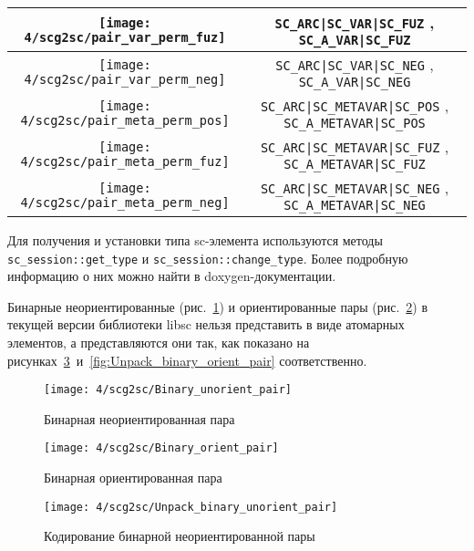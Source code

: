 \begin{table}[ht]
\begin{tabular}{|c|c|}
    \hline
	\texttt{[image: 4/scg2sc/pair\_var\_perm\_fuz]} & \verb+SC_ARC|SC_VAR|SC_FUZ+
    , \verb+SC_A_VAR|SC_FUZ+ \\
    
    \hline
	\texttt{[image: 4/scg2sc/pair\_var\_perm\_neg]} & \verb+SC_ARC|SC_VAR|SC_NEG+
    , \verb+SC_A_VAR|SC_NEG+ \\
    
    \hline
	\texttt{[image: 4/scg2sc/pair\_meta\_perm\_pos]} & \verb+SC_ARC|SC_METAVAR|SC_POS+
    , \verb+SC_A_METAVAR|SC_POS+ \\
    
    \hline
	\texttt{[image: 4/scg2sc/pair\_meta\_perm\_fuz]} & \verb+SC_ARC|SC_METAVAR|SC_FUZ+
    , \verb+SC_A_METAVAR|SC_FUZ+ \\
    
    \hline
	\texttt{[image: 4/scg2sc/pair\_meta\_perm\_neg]} & \verb+SC_ARC|SC_METAVAR|SC_NEG+
    , \verb+SC_A_METAVAR|SC_NEG+ \\
    
    \hline
  \end{tabular}
  \label{tab:SCgType2SCType}
\end{table}

Для получения и установки типа sc-элемента используются методы
\lstinline{sc_session::get_type} и
\lstinline{sc_session::change_type}. Более подробную информацию о них
можно найти в doxygen-документации.

Бинарные неориентированные (рис.~\ref{fig:Binary_unorient_pair}) и
ориентированные пары (рис.~\ref{fig:Binary_orient_pair}) в текущей
версии библиотеки libsc нельзя представить в виде атомарных элементов,
а представляются они так, как показано на
рисунках~\ref{fig:Unpack_binary_unorient_pair}~и~\ref{fig:Unpack_binary_orient_pair}
соответственно.

\begin{figure}[h!]
  \centering
  \texttt{[image: 4/scg2sc/Binary\_unorient\_pair]}
  \caption{Бинарная неориентированная пара}
  \label{fig:Binary_unorient_pair}
\end{figure}

\begin{figure}[h!]
  \centering
  \texttt{[image: 4/scg2sc/Binary\_orient\_pair]}
  \caption{Бинарная ориентированная пара}
  \label{fig:Binary_orient_pair}
\end{figure}

\begin{figure}[h!]
  \centering
  \texttt{[image: 4/scg2sc/Unpack\_binary\_unorient\_pair]}
  \caption{Кодирование бинарной неориентированной пары}
  \label{fig:Unpack_binary_unorient_pair}
\end{figure}

